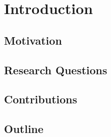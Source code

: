 \chapter{Introduction}

\section{Motivation}
\cite{burger2014diss}
\Blindtext[1]

\section{Research Questions}
\Blindtext[1]

\section{Contributions}
\Blindtext[1]

\section{Outline}
\Blindtext[1]
